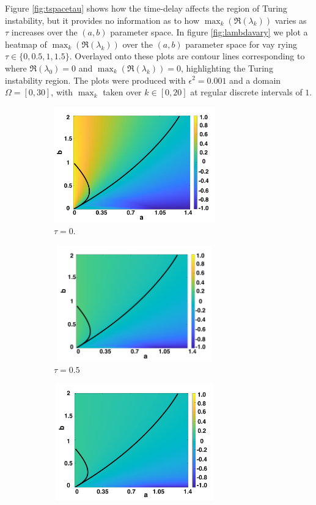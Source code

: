 \documentclass[12pt]{report}
\begin{document}
Figure \ref{fig:tspacetau} shows how the time-delay affects the region of Turing instability, but it provides no information as to how $\max_k(\Re(\lambda_k))$ varies as $\tau$ increases over the $(a,b)$ parameter space. In figure \ref{fig:lambdavary} we plot a heatmap of $\max_k(\Re(\lambda_k))$ over the $(a,b)$ parameter space for vay
rying $\tau\in\{0,0.5,1,1.5\}$. Overlayed onto these plots are contour lines corresponding to where $\Re(\lambda_0)=0$ and $\max_k(\Re(\lambda_k))=0$, highlighting the Turing instability region. The plots were produced with $\epsilon^2=0.001$ and a domain $\Omega=[0,30]$, with $\max_k$ taken over $k\in[0,20]$ at regular discrete intervals of $1$.
\begin{figure}[H]
    \centering
    \begin{subfigure}[b]{0.45\textwidth}
        \centering
        \includegraphics[width=7cm,height=5cm]{tau0bif.png}
        \caption{$\tau=0$.}
        \label{}
    \end{subfigure}
    \hfill
    \begin{subfigure}[b]{0.45\textwidth}
        \centering
        \includegraphics[width=7cm,height=5cm]{tau05bif.png}
        \caption{$\tau=0.5$}
        \label{}
    \end{subfigure}
    \hfill
    \begin{subfigure}[b]{0.45\textwidth}
        \centering
        \includegraphics[width=7cm,height=5cm]{tau1bif.png}

\end{subfigure}
\end{figure}
\end{document}
